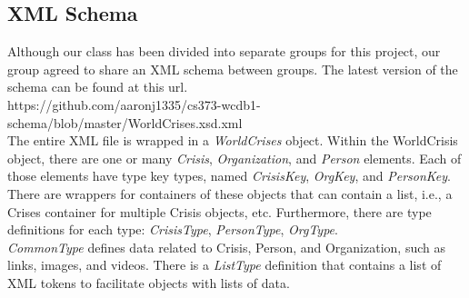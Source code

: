 \documentclass[12pt]{report}
\begin{document}
\subsection*{XML Schema}
\hfill

Although our class has been divided into separate groups for this project, our group agreed to share an XML schema between groups.
The latest version of the schema can be found at this url.\\

\noindent \small
https://github.com/aaronj1335/cs373-wcdb1-schema/blob/master/WorldCrises.xsd.xml\\


The entire XML file is wrapped in a \emph{WorldCrises} object.
Within the WorldCrisis object, there are one or many \emph{Crisis}, \emph{Organization}, and \emph{Person} elements.
Each of those elements have type key types, named \emph{CrisisKey}, \emph{OrgKey}, and \emph{PersonKey}.
There are wrappers for containers of these objects that can contain a list,
i.e., a Crises container for multiple Crisis objects, etc.
Furthermore, there are type definitions for each type: \emph{CrisisType}, \emph{PersonType}, \emph{OrgType}.\\


\emph{CommonType} defines data related to Crisis, Person, and Organization,
such as links, images, and videos.
There is a \emph{ListType} definition that contains a list of XML tokens to facilitate objects with lists of data.
\end{document}
